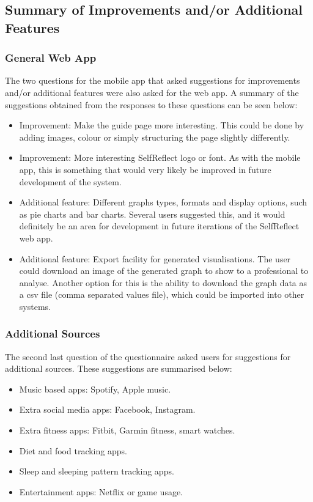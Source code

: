 \documentclass[11pt,openright,a4paper]{report}
\begin{document}
\subsection{Summary of Improvements and/or Additional Features} \label{subsec:addsources}
\subsubsection{General Web App}
The two questions for the mobile app that asked suggestions for improvements and/or additional features were also asked for the web app. A summary of the suggestions obtained from the responses to these questions can be seen below:
\begin{itemize}
\item Improvement: Make the guide page more interesting. This could be done by adding images, colour or simply structuring the page slightly differently.
\item Improvement: More interesting SelfReflect logo or font. As with the mobile app, this is something that would very likely be improved in future development of the system.
\item Additional feature: Different graphs types, formats and display options, such as pie charts and bar charts. Several users suggested this, and it would definitely be an area for development in future iterations of the SelfReflect web app.
\item Additional feature: Export facility for generated visualisations. The user could download an image of the generated graph to show to a professional to analyse. Another option for this is the ability to download the graph data as a csv file (comma separated values file), which could be imported into other systems.
\end{itemize}

\newpage
\subsubsection{Additional Sources}
The second last question of the questionnaire asked users for suggestions for additional sources. These suggestions are summarised below:
\begin{itemize}
\item Music based apps: Spotify, Apple music.
\item Extra social media apps: Facebook, Instagram.
\item Extra fitness apps: Fitbit, Garmin fitness, smart watches.
\item Diet and food tracking apps.
\item Sleep and sleeping pattern tracking apps.
\item Entertainment apps: Netflix or game usage.
\end{itemize}
\end{document}
